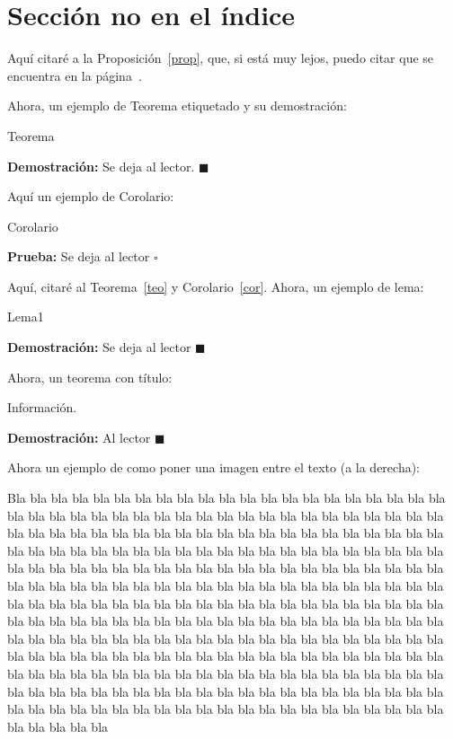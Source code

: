 \documentclass[12pt]{book}%
\theoremstyle{newstyle}%
\newcommand\fin[1]{\leavevmode\unskip\penalty9999 \hbox{}\nobreak\hfill\quad\hbox{#1}}
\newcommand\FINDEM{\fin{$\blacksquare$}}
\newcommand\FINPBA{\fin{$\square$}}
\newenvironment{dem}{\noindent \textbf{Demostración:}}{\FINDEM}
\newenvironment{pba}{\noindent \textbf{Prueba:}}{\FINPBA}
\begin{document}
\section*{Sección no en el índice}

Aquí citaré a la Proposición~\ref{prop}, que, si está muy lejos, puedo citar que se encuentra en la página~\pageref{prop}.

Ahora, un ejemplo de Teorema etiquetado y su demostración:

\begin{teo}\label{teo}
Teorema
\end{teo}
\begin{dem}
Se deja al lector.
\end{dem}

Aquí un ejemplo de Corolario:

\begin{cor}\label{cor}
Corolario
\end{cor}
\begin{pba}
Se deja al lector
\end{pba}


Aquí, citaré al Teorema~\ref{teo} y Corolario~\ref{cor}. Ahora, un ejemplo de lema:

\begin{lema} \label{lema1}
Lema1
\end{lema}
\begin{dem}
Se deja al lector
\end{dem}

Ahora, un teorema con título:

\begin{teo}\label{teotitulo}
Información.
\end{teo}
\begin{dem}
Al lector
\end{dem}


Ahora un ejemplo de como poner una imagen entre el texto (a la derecha):


Bla bla bla bla bla bla bla bla bla bla bla bla bla bla bla bla bla bla bla bla bla bla bla bla bla bla bla bla bla bla bla bla bla bla bla bla bla bla bla bla bla bla bla bla bla bla bla bla bla bla bla bla bla bla bla bla bla bla bla bla bla bla bla bla bla bla bla bla bla bla bla bla bla bla bla bla bla bla bla bla bla bla bla bla bla bla bla bla bla bla bla bla bla bla bla bla bla bla bla bla bla bla bla bla bla bla bla bla bla bla bla bla bla bla bla bla bla bla bla bla bla bla bla bla bla bla bla bla bla bla bla bla bla bla bla bla bla bla bla bla bla bla bla bla bla bla bla bla bla bla bla bla bla bla bla bla bla bla bla bla bla bla bla bla bla bla bla bla bla bla bla bla bla bla bla bla bla bla bla bla bla bla bla bla bla bla bla bla bla bla bla bla bla bla bla bla bla bla bla bla bla bla bla bla bla bla bla bla bla bla bla bla bla bla bla bla bla bla bla bla bla bla bla bla bla bla bla bla bla bla bla bla bla bla bla bla bla bla bla bla bla bla bla bla bla bla bla bla bla bla bla bla bla bla bla bla bla bla bla bla bla bla bla bla bla bla bla bla bla bla bla bla bla bla bla bla bla bla
\end{document}
